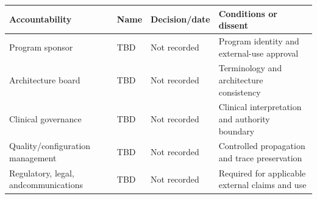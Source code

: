 \documentclass[11pt,letterpaper]{article}
\begin{document}
\begin{small}
\begin{longtable}{@{}L{0.24\textwidth}L{0.20\textwidth}L{0.18\textwidth}L{0.28\textwidth}@{}}
\toprule
{}\textbf{Accountability} & \textbf{Name} & \textbf{Decision/date} & \textbf{Conditions or dissent} \\
\midrule
Program sponsor & TBD & Not recorded & Program identity and external-use approval \\
\addlinespace[2pt]
Architecture board & TBD & Not recorded & Terminology and architecture consistency \\
\addlinespace[2pt]
Clinical governance & TBD & Not recorded & Clinical interpretation and authority boundary \\
\addlinespace[2pt]
Quality/configuration management & TBD & Not recorded & Controlled propagation and trace preservation \\
\addlinespace[2pt]
Regulatory, legal, and\newline communications & TBD & Not recorded & Required for applicable external claims and use \\
\bottomrule
\end{longtable}
\end{small}
\end{document}

